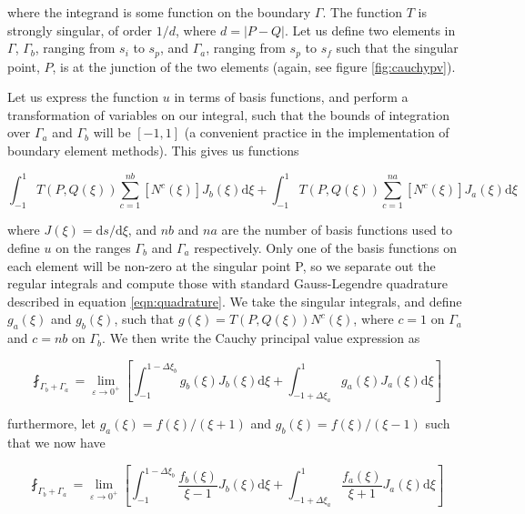 where the integrand is some function on the boundary $\Gamma$. The function $T$ is strongly singular, of order $1/d$, where $d=|P-Q|$. Let us define two elements in $\Gamma$, $\Gamma_b$, ranging from $s_i$ to $s_p$, and $\Gamma_a$, ranging from $s_p$ to $s_f$ such that the singular point, $P$, is at the junction of the two elements (again, see figure \ref{fig:cauchypv}).

Let us express the function $u$ in terms of basis functions, and perform a transformation of variables on our integral, such that the bounds of integration over $\Gamma_a$ and $\Gamma_b$ will be $[-1,1]$ (a convenient practice in the implementation of boundary element methods). This gives us functions 

\begin{equation}
\int_{-1}^{1} T(P,Q(\xi)) \sum^{nb}_{c=1} \left[ N^c(\xi) \right] J_b(\xi) \mathrm{d}\xi + \int_{-1}^{1} T(P,Q(\xi)) \sum^{na}_{c=1} \left[ N^c(\xi) \right]  J_a(\xi) \mathrm{d}\xi 
\end{equation}

where $J(\xi) = \mathrm{d}s/\mathrm{d}\xi$, and $nb$ and $na$ are the number of basis functions used to define $u$ on the ranges $\Gamma_b$ and $\Gamma_a$ respectively. Only one of the basis functions on each element will be non-zero at the singular point P, so we separate out the regular integrals and compute those with standard Gauss-Legendre quadrature described in equation \ref{eqn:quadrature}. We take the singular integrals, and define $g_a(\xi)$ and $g_b(\xi)$, such that $g(\xi)=T(P,Q(\xi)) N^c(\xi)$, where $c=1$ on $\Gamma_a$ and $c=nb$ on $\Gamma_b$. We then write the Cauchy principal value expression as


\begin{equation}
\fint_{\Gamma_b + \Gamma_a} = \lim_{ \varepsilon \rightarrow 0^+} \left[ \int_{-1}^{1 -\Delta \xi_b} g_b(\xi) J_b(\xi) \mathrm{d}\xi + \int_{-1 + \Delta \xi_a}^{1} g_a(\xi) J_a(\xi) \mathrm{d}\xi \right]
\end{equation}

furthermore, let $g_a(\xi) = f(\xi)/(\xi+1)$ and $g_b(\xi) = f(\xi)/(\xi-1)$ such that we now have

\begin{equation}
\fint_{\Gamma_b + \Gamma_a} = \lim_{ \varepsilon \rightarrow 0^+} \left[ \int_{-1}^{1 -\Delta \xi_b} \frac{f_b(\xi)}{\xi-1} J_b(\xi) \mathrm{d}\xi + \int_{-1 + \Delta \xi_a}^{1} \frac{f_a(\xi)}{\xi+1} J_a(\xi) \mathrm{d}\xi \right]
\end{equation}

